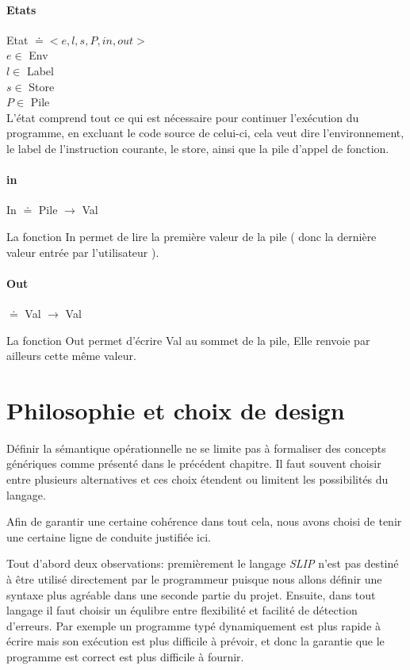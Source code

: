 \paragraph{Etats} Etat $\doteq <e,l,s,P,in,out>$\\

$e \in $ Env   \\
$l \in $ Label \\
$s \in $ Store \\
$P \in $ Pile  \\
L'état comprend tout ce qui est nécessaire pour continuer l'exécution du programme, en excluant le
code source de celui-ci, cela veut dire l'environnement, le label de l'instruction courante, le store,
ainsi que la pile d'appel de fonction. 

\paragraph{in} In $\doteq$ Pile $\rightarrow$ Val

La fonction In permet de lire la première valeur de la pile ( donc la dernière valeur entrée par l'utilisateur ).

\paragraph{Out} $\doteq$ Val  $\rightarrow$ Val

La fonction Out permet d'écrire Val au sommet de la pile, Elle renvoie par ailleurs cette même valeur.

\section{Philosophie et choix de design}
	Définir la sémantique opérationnelle ne se limite pas à formaliser des concepts génériques
	comme présenté dans le précédent chapitre. Il faut souvent choisir entre plusieurs alternatives
	et ces choix étendent ou limitent les possibilités du langage.

	Afin de garantir une certaine cohérence dans tout cela, nous avons choisi de tenir une 
	certaine ligne de conduite justifiée ici.

	Tout d'abord deux observations: premièrement le langage \emph{SLIP} n'est pas destiné à 
	être utilisé directement par le programmeur puisque nous allons définir une syntaxe plus 
	agréable dans une seconde partie du projet. Ensuite, dans tout langage il faut choisir 
	un équlibre entre flexibilité et facilité de détection d'erreurs. Par exemple un programme
	typé dynamiquement est plus rapide à écrire mais son exécution est plus difficile à prévoir,
	et donc la garantie que le programme est correct est plus difficile à fournir.


